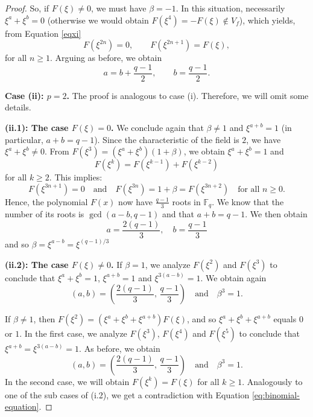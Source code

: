 \documentclass[10pt,a4paper]{amsart}
\begin{document}
\begin{proof}
  So, if $F(\xi) \neq 0$, we must have $\beta = -1$. In this situation, necessarily $\xi^a+\xi^b=0$ (otherwise we would obtain $F(\xi^4) = - F(\xi) \notin V_f$), which yields, from Equation \eqref{eqxi}
\[
F(\xi^{2n})=0, \qquad F(\xi^{2n+1})=F(\xi),
\]
for all $n\ge1$. Arguing as before, we obtain
\[
a = b + \frac{q-1}{2}, \qquad b = \frac{q-1}{2}.
\]

\medskip

\noindent
\textbf{Case (ii): $p = 2$.} The proof is analogous to case (i). Therefore, we will omit some details.

\noindent
\textbf{(ii.1): The case $F(\xi) = 0$.} We conclude again that $\beta \neq 1$ and $\xi^{a+b} = 1$ (in particular, $a + b = q - 1$). Since the characteristic of the field is $2$, we have $\xi^a + \xi^b \neq 0$. From $F(\xi^3) = (\xi^a + \xi^b)(1 + \beta)$, we obtain $\xi^a + \xi^b = 1$ and
$$F(\xi^k) = F(\xi^{k - 1}) + F(\xi^{k - 2})$$
for all $k \geq 2$. This implies:
$$F(\xi^{3n + 1}) = 0 \quad \text{and} \quad F(\xi^{3n}) = 1 + \beta = F(\xi^{3n+2}) \quad \text{for all } n \geq 0.$$
Hence, the polynomial $F(x)$ now have $\frac{q-1}{3}$ roots in $\mathbb{F}_q$. We know that the number of its roots is $\gcd(a - b, q - 1)$ and that $a + b = q - 1$. We then obtain
$$a = \frac{2(q - 1)}{3}, \quad b = \frac{q - 1}{3}$$
and so $\beta = \xi^{a - b} = \xi^{(q-1)/3}$

\smallskip

\noindent
\textbf{(ii.2): The case $F(\xi) \neq 0$.} If $\beta = 1$, we analyze $F(\xi^2)$ and $F(\xi^3)$ to conclude that $\xi^a + \xi^b = 1$, $\xi^{a+b} = 1$ and $\xi^{3(a - b)} = 1$. We obtain again 
$$(a, b) = \left( \frac{2(q - 1)}{3},\, \frac{q - 1}{3} \right) \quad \textrm{and} \quad  \beta^3 = 1.$$

If $\beta \neq 1$, then $F(\xi^2) = (\xi^a + \xi^b + \xi^{a+b})F(\xi)$, and so $\xi^a + \xi^b + \xi^{a+b}$ equals $0$ or $1$. In the first case, we analyze $F(\xi^3)$, $F(\xi^4)$ and $F(\xi^5)$ to conclude that $\xi^{a+b} = \xi^{3(a - b)} = 1$. As before, we obtain
$$(a, b) = \left( \frac{2(q - 1)}{3},\, \frac{q - 1}{3} \right) \quad \textrm{and} \quad  \beta^3 = 1.$$
In the second case, we will obtain $F(\xi^k) = F(\xi)$ for all $k \geq 1$. Analogously to one of the sub cases of (i.2), we get a contradiction with Equation \eqref{eq:binomial-equation}.
\end{proof}
\end{document}
